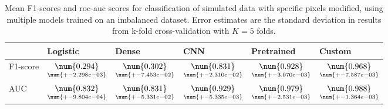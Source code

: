 \begin{table}
\centering
\caption{
Mean F1-scores and roc-auc scores for classification of simulated data with specific pixels
modified, using multiple models trained on an imbalanced dataset. Error estimates are the 
standard deviation in results from k-fold cross-validation with $K=5$ folds.
}
\label{tab:classification-simulated-pixelmod-f1-auc}
\begin{tabular}{llllll}
\toprule
{} &                                            Logistic &                                               Dense &                                                 CNN &                                          Pretrained &                                              Custom \\
\midrule
F1-score &  $\underset{\num{+- 2.298e-03 }  }{\num{ 0.294 } }$ &  $\underset{\num{+- 7.453e-02 }  }{\num{ 0.302 } }$ &  $\underset{\num{+- 2.310e-02 }  }{\num{ 0.831 } }$ &  $\underset{\num{+- 3.070e-03 }  }{\num{ 0.928 } }$ &  $\underset{\num{+- 7.587e-03 }  }{\num{ 0.968 } }$ \\
AUC      &  $\underset{\num{+- 9.804e-04 }  }{\num{ 0.832 } }$ &  $\underset{\num{+- 5.331e-02 }  }{\num{ 0.831 } }$ &  $\underset{\num{+- 5.335e-03 }  }{\num{ 0.929 } }$ &  $\underset{\num{+- 2.531e-03 }  }{\num{ 0.979 } }$ &  $\underset{\num{+- 1.364e-03 }  }{\num{ 0.988 } }$ \\
\bottomrule
\end{tabular}
\end{table}
